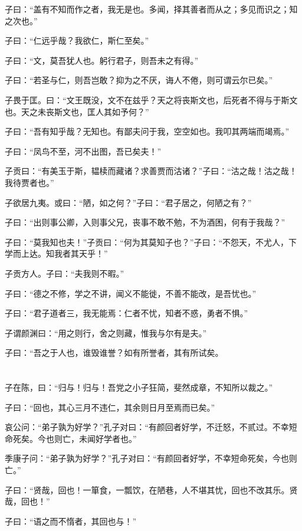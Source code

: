 \documentclass[a5paper]{ctexbook}
\begin{document}
    子曰：“盖有不知而作之者，我无是也。多闻，择其善者而从之；多见而识之；知之次也。”

    子曰：“仁远乎哉？我欲仁，斯仁至矣。”

    子曰：“文，莫吾犹人也。躬行君子，则吾未之有得。”

    子曰：“若圣与仁，则吾岂敢？抑为之不厌，诲人不倦，则可谓云尔已矣。”

    子畏于匡。曰：“文王既没，文不在兹乎？天之将丧斯文也，后死者不得与于斯文也。天之未丧斯文也，匡人其如予何？”

    子曰：“吾有知乎哉？无知也。有鄙夫问于我，空空如也。我叩其两端而竭焉。”

    子曰：“凤鸟不至，河不出图，吾已矣夫！”

    子贡曰：“有美玉于斯，韫椟而藏诸？求善贾而沽诸？”子曰：“沽之哉！沽之哉！我待贾者也。”

    子欲居九夷。或曰：“陋，如之何？”子曰：“君子居之，何陋之有？”

    子曰：“出则事公卿，入则事父兄，丧事不敢不勉，不为酒困，何有于我哉？”

    子曰：“莫我知也夫！”子贡曰：“何为其莫知子也？”子曰：“不怨天，不尤人，下学而上达。知我者其天乎！”

    子贡方人。子曰：“夫我则不暇。”

    子曰：“德之不修，学之不讲，闻义不能徙，不善不能改，是吾忧也。”

    子曰：“君子道者三，我无能焉：仁者不忧，知者不惑，勇者不惧。”

    子谓颜渊曰：“用之则行，舍之则藏，惟我与尔有是夫。”

    子曰：“吾之于人也，谁毁谁誉？如有所誉者，其有所试矣。

    \chapter{}

    子在陈，曰：“归与！归与！吾党之小子狂简，斐然成章，不知所以裁之。”

    子曰：“回也，其心三月不违仁，其余则日月至焉而已矣。”

    哀公问：“弟子孰为好学？”孔子对曰：“有颜回者好学，不迁怒，不贰过。不幸短命死矣。今也则亡，未闻好学者也。”

    季康子问：“弟子孰为好学？”孔子对曰：“有颜回者好学，不幸短命死矣，今也则亡。”

    子曰：“贤哉，回也！一箪食，一瓢饮，在陋巷，人不堪其忧，回也不改其乐。贤哉，回也！”

    子曰：“语之而不惰者，其回也与！”
\end{document}
